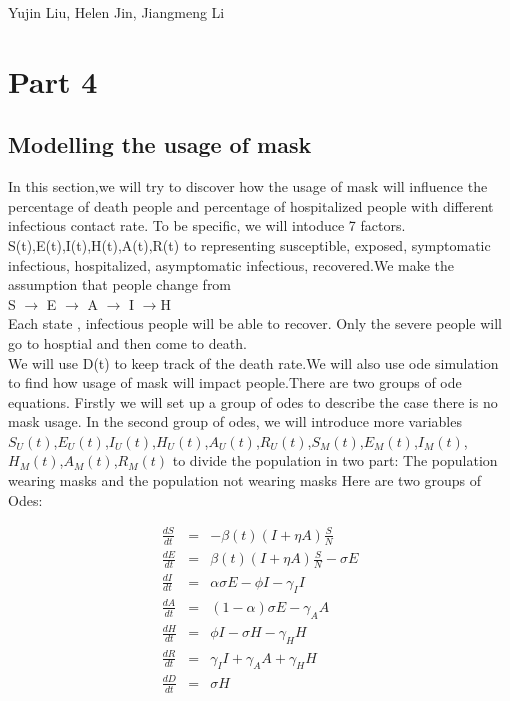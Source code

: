 \documentclass{article}
\begin{document}
\begin{titlepage}
  \begin{center}
  \huge{Yujin Liu, Helen Jin, Jiangmeng Li}
  \end{center}


\end{titlepage}

\section{Part 4}
\subsection{Modelling the usage of mask}
In this section,we will try to discover how the usage of mask will influence the percentage of death people and percentage of hospitalized people with different infectious contact rate.
To be specific, we will intoduce 7 factors. S(t),E(t),I(t),H(t),A(t),R(t) to representing susceptible, exposed, symptomatic infectious, hospitalized, asymptomatic infectious, recovered.We make the assumption that people change from \\
S $\rightarrow$ E $\rightarrow$ A $\rightarrow$ I $\rightarrow$H \\ Each state , infectious people will be able to recover. Only the severe people will go to hosptial and then come to death.\\We will use D(t) to keep track of the death rate.We will also use ode simulation to find how usage of mask will impact people.There are two groups of ode equations. Firstly we will set up a group of odes to describe the case there is no mask usage. In the second group of odes, we will introduce more variables
$S_{U}(t)$,$E_{U}(t)$,$I_{U}(t)$,$H_{U}(t)$,$A_{U}(t)$,$R_{U}(t)$,$S_{M}(t)$,$E_{M}(t)$,$I_{M}(t)$,$H_{M}(t)$,$A_{M}(t)$,$R_{M}(t)$ to divide the population in two part: The population wearing masks and the population not wearing masks
Here are two groups of Odes:\\
\begin{minipage}{0.45\textwidth}
\begin{eqnarray}
  \frac{dS}{dt} &=& -\beta{(t)}(I+\eta A)\frac{S}{N}\nonumber\\
  \frac{dE}{dt} &=& \beta(t)(I+\eta A)\frac{S}{N}-\sigma{E}\nonumber\\
  \frac{dI}{dt} &=& \alpha\sigma{E}-\phi{I}-\gamma_{I}I\nonumber\\
  \frac{dA}{dt} &=& (1-\alpha)\sigma E-\gamma_{A}A\nonumber\\
  \frac{dH}{dt} &=& \phi I - \sigma H - \gamma_{H}H\nonumber\\
  \frac{dR}{dt} &=& \gamma_{I}{I} + \gamma_{A}{A}+\gamma_{H}{H}\nonumber\\
  \frac{dD}{dt} &=& \sigma H\nonumber\\
\end{eqnarray}
\end{minipage}
\end{document}

